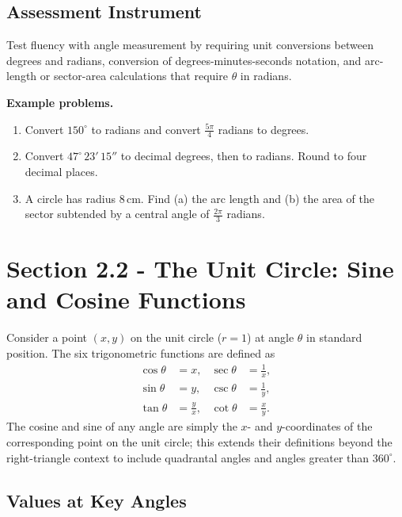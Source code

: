 \subsection{Assessment Instrument}
\label{ssec:asse-3669}

Test fluency with angle measurement by requiring unit conversions between degrees and
radians, conversion of degrees-minutes-seconds notation, and arc-length or sector-area
calculations that require $\theta$ in radians.

\textbf{Example problems.}
\begin{enumerate}
    \item Convert $150^{\circ}$ to radians and convert $\frac{5\pi}{4}$ radians to degrees.
    \item Convert $47^{\circ}\,23'\,15''$ to decimal degrees, then to radians. Round to four decimal places.
    \item A circle has radius $8\,\text{cm}$. Find (a) the arc length and (b) the area of the sector subtended by a central angle of $\frac{2\pi}{3}$ radians.
\end{enumerate}

\section{Section 2.2 - The Unit Circle: Sine and Cosine Functions}
\label{sec:sect-008d}

Consider a point $(x, y)$ on the unit circle ($r = 1$) at angle $\theta$ in
standard position.  The six trigonometric functions are defined as
\begin{align}
  \cos\theta &= x, & \sec\theta &= \frac{1}{x}, \\
  \sin\theta &= y, & \csc\theta &= \frac{1}{y}, \\
  \tan\theta &= \frac{y}{x}, & \cot\theta &= \frac{x}{y}.
\end{align}
The cosine and sine of any angle are simply the $x$- and $y$-coordinates of
the corresponding point on the unit circle; this extends their definitions
beyond the right-triangle context to include quadrantal angles and angles
greater than $360^{\circ}$.

\subsection*{Values at Key Angles}

